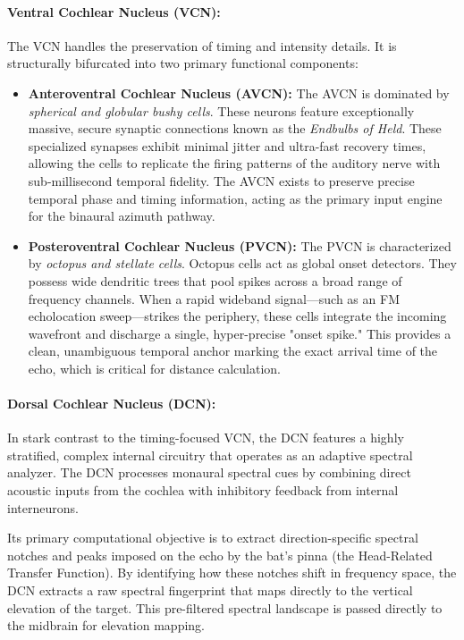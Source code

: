 \paragraph{Ventral Cochlear Nucleus (VCN):} 
The VCN handles the preservation of timing and intensity details. It is structurally bifurcated into two primary functional components:
\begin{itemize}
    \item \textbf{Anteroventral Cochlear Nucleus (AVCN):} The AVCN is dominated by \textit{spherical and globular bushy cells}. These neurons feature exceptionally massive, secure synaptic connections known as the \textit{Endbulbs of Held}. These specialized synapses exhibit minimal jitter and ultra-fast recovery times, allowing the cells to replicate the firing patterns of the auditory nerve with sub-millisecond temporal fidelity. The AVCN exists to preserve precise temporal phase and timing information, acting as the primary input engine for the binaural azimuth pathway.
    \item \textbf{Posteroventral Cochlear Nucleus (PVCN):} The PVCN is characterized by \textit{octopus and stellate cells}. Octopus cells act as global onset detectors. They possess wide dendritic trees that pool spikes across a broad range of frequency channels. When a rapid wideband signal---such as an FM echolocation sweep---strikes the periphery, these cells integrate the incoming wavefront and discharge a single, hyper-precise "onset spike." This provides a clean, unambiguous temporal anchor marking the exact arrival time of the echo, which is critical for distance calculation.
\end{itemize}

\paragraph{Dorsal Cochlear Nucleus (DCN):}
In stark contrast to the timing-focused VCN, the DCN features a highly stratified, complex internal circuitry that operates as an adaptive spectral analyzer. The DCN processes monaural spectral cues by combining direct acoustic inputs from the cochlea with inhibitory feedback from internal interneurons. 

Its primary computational objective is to extract direction-specific spectral notches and peaks imposed on the echo by the bat's pinna (the Head-Related Transfer Function). By identifying how these notches shift in frequency space, the DCN extracts a raw spectral fingerprint that maps directly to the vertical elevation of the target. This pre-filtered spectral landscape is passed directly to the midbrain for elevation mapping.


